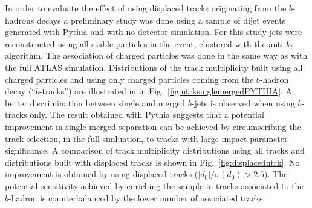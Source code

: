 In order to evaluate the effect of using displaced tracks originating from the $b$-hadrons decays a preliminary study was done using a sample of dijet events generated with {\sc Pythia} and with no detector simulation. For this study jets were reconstructed using all stable particles in the event, clustered with the anti-$k_t$ algorithm. The association of charged particles was done in the same way as with the full ATLAS simulation. Distributions of the track multiplicity built using all charged particles and using only charged particles coming from the $b$-hadron decay (``$b$-tracks'') are illustrated in  in Fig.~\ref{fig:ntrksinglemergedPYTHIA}. A better discrimination between single and merged $b$-jets is observed when using $b$-tracks only. The result obtained with {\sc Pythia} suggests that a potential improvement in single-merged separation can be achieved by circumscribing the track selection, in the full simluation, to tracks with large impact parameter significance. %
 A comparison of track multiplicity distributions using all tracks and distributions built with displaced tracks is shown in Fig.~\ref{fig:displacedntrk}. No improvement is obtained by using displaced tracks ($|d_0|/\sigma(d_0)> 2.5$). The potential sensitivity achieved by enriching the sample in tracks associated to the $b$-hadron is counterbalanced by the lower number of associated tracks.

